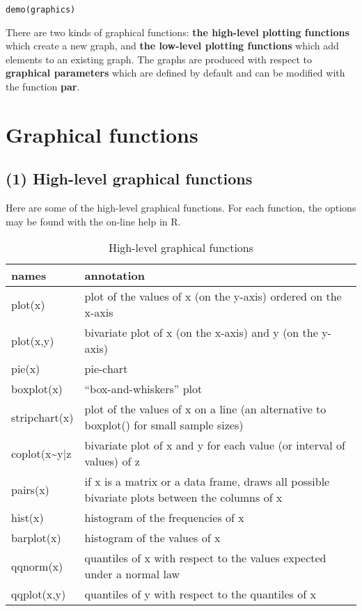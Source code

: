 \documentclass[]{book}
\theoremstyle{definition}
\theoremstyle{definition}
\theoremstyle{definition}
\theoremstyle{remark}
\begin{document}
\begin{verbatim}
demo(graphics)
\end{verbatim}

There are two kinds of graphical functions: \textbf{the high-level
plotting functions} which create a new graph, and \textbf{the low-level
plotting functions} which add elements to an existing graph. The graphs
are produced with respect to \textbf{graphical parameters} which are
defined by default and can be modified with the function \textbf{par}.

\section{Graphical functions}\label{graphical-functions}

\subsection{(1) High-level graphical
functions}\label{high-level-graphical-functions}

Here are some of the high-level graphical functions. For each function,
the options may be found with the on-line help in R.

\begin{table}

\caption{\label{tab:unnamed-chunk-108}High-level graphical functions}
\centering
\begin{tabular}[t]{l|l}
\hline
names & annotation\\
\hline
plot(x) & plot of the values of x (on the y-axis) ordered on the x-axis\\
\hline
plot(x,y) & bivariate plot of x (on the x-axis) and y (on the y-axis)\\
\hline
pie(x) & pie-chart\\
\hline
boxplot(x) & “box-and-whiskers” plot\\
\hline
stripchart(x) & plot of the values of x on a line (an alternative to boxplot() for small sample sizes)\\
\hline
coplot(x\textasciitilde{}y|z & bivariate plot of x and y for each value (or interval of values) of z\\
\hline
pairs(x) & if x is a matrix or a data frame, draws all possible bivariate plots between the columns of x\\
\hline
hist(x) & histogram of the frequencies of x\\
\hline
barplot(x) & histogram of the values of x\\
\hline
qqnorm(x) & quantiles of x with respect to the values expected under a normal law\\
\hline
qqplot(x,y) & quantiles of y with respect to the quantiles of x\\
\hline
\end{tabular}
\end{table}
\end{document}
